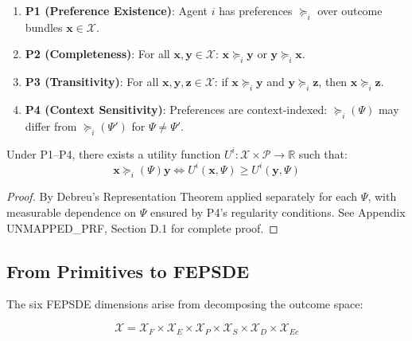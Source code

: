 \begin{enumerate}
\item \textbf{P1 (Preference Existence)}: Agent $i$ has preferences $\succeq_i$
over outcome bundles $\mathbf{x} \in \mathcal{X}$.

\item \textbf{P2 (Completeness)}: For all $\mathbf{x}, \mathbf{y} \in \mathcal{X}$:
$\mathbf{x} \succeq_i \mathbf{y}$ or $\mathbf{y} \succeq_i \mathbf{x}$.

\item \textbf{P3 (Transitivity)}: For all $\mathbf{x}, \mathbf{y}, \mathbf{z} \in \mathcal{X}$:
if $\mathbf{x} \succeq_i \mathbf{y}$ and $\mathbf{y} \succeq_i \mathbf{z}$, then
$\mathbf{x} \succeq_i \mathbf{z}$.

\item \textbf{P4 (Context Sensitivity)}: Preferences are context-indexed:
$\succeq_i(\Psi)$ may differ from $\succeq_i(\Psi')$ for $\Psi \neq \Psi'$.
\end{enumerate}

\begin{proposition}
Under P1--P4, there exists a utility function $U^i: \mathcal{X} \times \mathcal{P} \to \mathbb{R}$
such that:
\begin{equation}
\mathbf{x} \succeq_i(\Psi) \mathbf{y} \Leftrightarrow U^i(\mathbf{x}, \Psi) \geq U^i(\mathbf{y}, \Psi)
\end{equation}
\end{proposition}

\begin{proof}
By Debreu's Representation Theorem applied separately for each $\Psi$, with
measurable dependence on $\Psi$ ensured by P4's regularity conditions.
See Appendix UNMAPPED_PRF, Section D.1 for complete proof.
\end{proof}

\subsection{From Primitives to FEPSDE}

The six FEPSDE dimensions arise from decomposing the outcome space:

\begin{equation}
\mathcal{X} = \mathcal{X}_F \times \mathcal{X}_E \times \mathcal{X}_P \times
\mathcal{X}_S \times \mathcal{X}_D \times \mathcal{X}_{Ec}
\end{equation}

